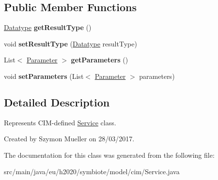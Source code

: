 \subsection*{Public Member Functions}
\begin{DoxyCompactItemize}
\item 
\mbox{\label{classeu_1_1h2020_1_1symbiote_1_1model_1_1cim_1_1Service_ac3de4fe2018346eddb55bcfe5aa03a49}} 
\hyperlink{classeu_1_1h2020_1_1symbiote_1_1model_1_1cim_1_1Datatype}{Datatype} {\bfseries get\+Result\+Type} ()
\item 
\mbox{\label{classeu_1_1h2020_1_1symbiote_1_1model_1_1cim_1_1Service_a4b73e3b7f47021b49fc4926e3ea16f87}} 
void {\bfseries set\+Result\+Type} (\hyperlink{classeu_1_1h2020_1_1symbiote_1_1model_1_1cim_1_1Datatype}{Datatype} result\+Type)
\item 
\mbox{\label{classeu_1_1h2020_1_1symbiote_1_1model_1_1cim_1_1Service_a1d5706d30d9e83aa31e353b7b267ae4e}} 
List$<$ \hyperlink{classeu_1_1h2020_1_1symbiote_1_1model_1_1cim_1_1Parameter}{Parameter} $>$ {\bfseries get\+Parameters} ()
\item 
\mbox{\label{classeu_1_1h2020_1_1symbiote_1_1model_1_1cim_1_1Service_af9efa451f43770e5b706ddb698108c03}} 
void {\bfseries set\+Parameters} (List$<$ \hyperlink{classeu_1_1h2020_1_1symbiote_1_1model_1_1cim_1_1Parameter}{Parameter} $>$ parameters)
\end{DoxyCompactItemize}


\subsection{Detailed Description}
Represents C\+I\+M-\/defined \hyperlink{classeu_1_1h2020_1_1symbiote_1_1model_1_1cim_1_1Service}{Service} class.

Created by Szymon Mueller on 28/03/2017. 

The documentation for this class was generated from the following file\+:\begin{DoxyCompactItemize}
\item 
src/main/java/eu/h2020/symbiote/model/cim/Service.\+java\end{DoxyCompactItemize}
